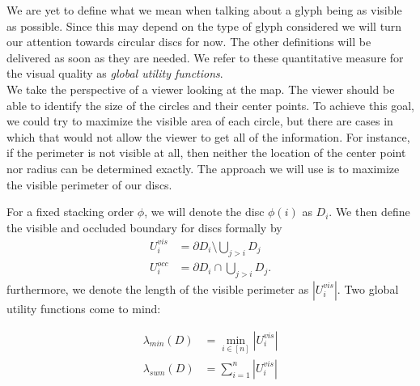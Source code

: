 \documentclass[a4paper,11pt]{article}
\begin{document}
We are yet to define what we mean when talking about a glyph being as visible as possible. Since this may depend on the type of glyph considered we will turn our attention towards circular discs for now. The other definitions will be delivered as soon as they are needed. We refer to these quantitative measure for the visual quality as \textit{global utility functions}.\\

We take the perspective of a viewer looking at the map. The viewer should be able to identify the size of the circles and their center points. To achieve this goal, we could try to maximize the visible area of each circle, but there are cases in which that would not allow the viewer to get all of the information. For instance, if the perimeter is not visible at all, then neither the location of the center point nor radius can be determined exactly. The approach we will use is to maximize the visible perimeter of our discs.\\

\newpage

For a fixed stacking order $\phi$, we will denote the disc $\phi(i)$ as $D_i$. We then define the visible and occluded boundary for discs formally by\\
%
\begin{align*}
  U_i^{vis} & =\partial D_i\setminus \bigcup_{j>i} D_{j} \\
  U_i^{occ} & =\partial D_i \cap \bigcup_{j>i} D_{j}.
\end{align*}
%
furthermore, we denote the length of the visible perimeter as $|U^{vis}_i|$. Two global utility functions come to mind:

\begin{align*}
    \lambda_{min} (D) &= \min_{i \in [n]}|U_i^{vis}|\\
    \lambda_{sum} (D) &= \sum_{i=1}^n|U_i^{vis}|
\end{align*}
\end{document}
